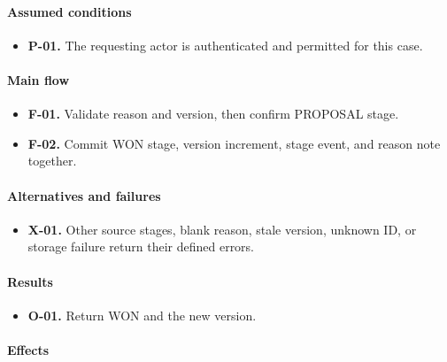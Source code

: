 \documentclass[10pt,a4paper]{article}
\begin{document}
\paragraph{Assumed conditions}

\begin{itemize}

\item \textbf{P-01.} The requesting actor is authenticated and permitted for this case.

\end{itemize}

\paragraph{Main flow}

\begin{itemize}

\item \textbf{F-01.} Validate reason and version, then confirm PROPOSAL stage.

\item \textbf{F-02.} Commit WON stage, version increment, stage event, and reason note together.

\end{itemize}

\paragraph{Alternatives and failures}

\begin{itemize}

\item \textbf{X-01.} Other source stages, blank reason, stale version, unknown ID, or storage failure return their defined errors.

\end{itemize}

\paragraph{Results}

\begin{itemize}

\item \textbf{O-01.} Return WON and the new version.

\end{itemize}

\paragraph{Effects}
\end{document}
